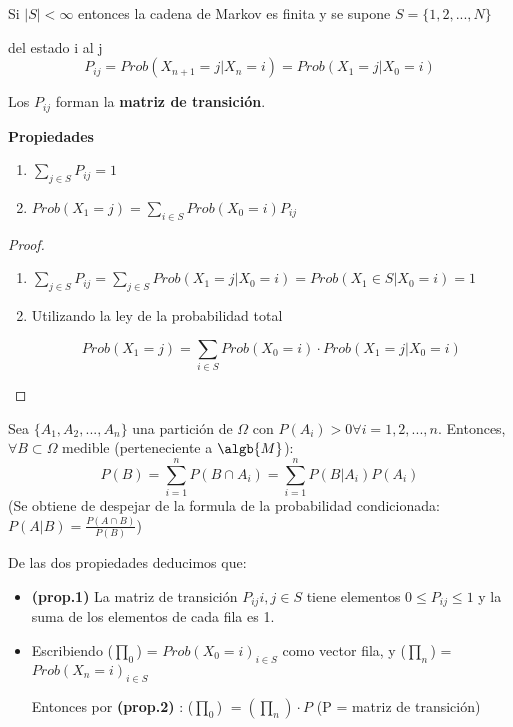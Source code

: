 Si $|S| < \infty$ entonces la cadena de Markov es finita y se supone $S =\{1,2,...,N\}$

\begin{defn}
	del estado i al j
	$$P_{ij} = Prob(X_{n+1} = j| X_n = i) = Prob (X_1 = j| X_0 = i)$$
\end{defn}

Los $P_{ij}$ forman la \textbf{matriz de transición}.


\textbf{Propiedades}
\begin{enumerate}
	\item $\sum_{j \in S} P_{ij} = 1$
	\item $Prob(X_1 = j)= \sum_{i \in S} Prob(X_0 = i)P_{ij}$\\
\end{enumerate}

\begin{proof}
	\begin{enumerate}
		\item $\sum_{j \in S} P_{ij} = \sum_{j\in S} Prob(X_1 = j | X_0 = i) = Prob (X_1 \in S | X_0 = i) = 1$
		\item Utilizando la ley de la probabilidad total
	
		$$Prob(X_1 = j) = \sum_{i \in S} Prob (X_0 = i) \cdot Prob(X_1 = j| X_0 = i)$$
	\end{enumerate}
\end{proof}

	\begin{defn}
		Sea  $\{A_1, A_2,...,A_n\}$ una partición de $\Omega$ con $P(A_i)>0 \forall i=1,2,...,n$. Entonces, $\forall B \subset \Omega$ medible (perteneciente a $\algb{M}$):
		\[
		P(B)=\sum_{i=1}^{n}P(B\cap A_i)=\sum_{i=1}^{n}P(B|A_i)P(A_i)
		\]
		(Se obtiene de despejar de la formula de la probabilidad condicionada: $P(A|B)=\frac{P(A \cap B)}{P(B)}$)
	\end{defn}


De las dos propiedades deducimos que:
\begin{itemize}
	\item \textbf{(prop.1)} La matriz de transición $P_{ij} i,j \in S$ tiene elementos $0 \leq P_{ij} \leq 1$ y la suma de los elementos de cada fila es 1.
	\item Escribiendo ($\prod_0$) = ${Prob (X_0 =i)}_{i \in S}$ como vector fila, y ($\prod_n$) = ${Prob (X_n =i)}_{i \in S}$
	
	Entonces por \textbf{(prop.2)} : ($\prod_0$) $ = (\prod_n)\cdot P$ (P = matriz de transición)
\end{itemize}

